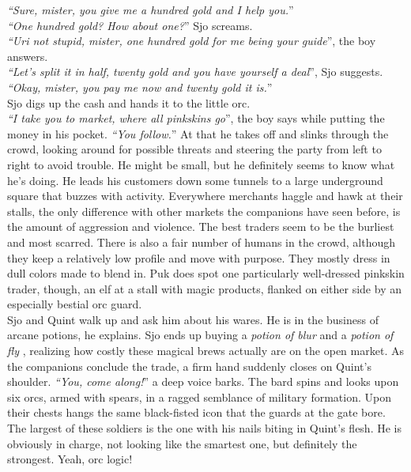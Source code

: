 {\itshape``Sure, mister, you give me a hundred gold and I help you.}''\\

{\itshape``One hundred gold? How about one?}'' Sjo screams.\\

{\itshape``Uri not stupid, mister, one hundred gold for me being your guide}'', the boy answers.\\

{\itshape``Let's split it in half, twenty gold and you have yourself a deal}'', Sjo suggests.\\

{\itshape``Okay, mister, you pay me now and twenty gold it is.}''\\

Sjo digs up the cash and hands it to the little orc.\\

{\itshape``I take you to market, where all pinkskins go}'', the boy says while putting the money in his pocket. {\itshape``You follow.}'' At that he takes off and slinks through the crowd, looking around for possible threats and steering the party from left to right to avoid trouble. He might be small, but he definitely seems to know what he's doing. He leads his customers down some tunnels to a large underground square that buzzes with activity. Everywhere merchants haggle and hawk at their stalls, the only difference with other markets the companions have seen before, is the amount of aggression and violence. The best traders seem to be the burliest and most scarred. There is also a fair number of humans in the crowd, although they keep a relatively low profile and move with purpose. They mostly dress in dull colors made to blend in. Puk does spot one particularly well-dressed pinkskin trader, though, an elf at a stall with magic products, flanked on either side by an especially bestial orc guard.\\

Sjo and Quint walk up and ask him about his wares. He is in the business of arcane potions, he explains. Sjo ends up buying a {\itshape potion of blur} and a  {\itshape potion of fly} , realizing how costly these magical brews actually are on the open market. As the companions conclude the trade, a firm hand suddenly closes on Quint's shoulder. {\itshape``You, come along!}'' a deep voice barks. The bard spins and looks upon six orcs, armed with spears, in a ragged semblance of military formation. Upon their chests hangs the same black-fisted icon that the guards at the gate bore. The largest of these soldiers is the one with his nails biting in Quint's flesh. He is obviously in charge, not looking like the smartest one, but definitely the strongest. Yeah, orc logic!\\

